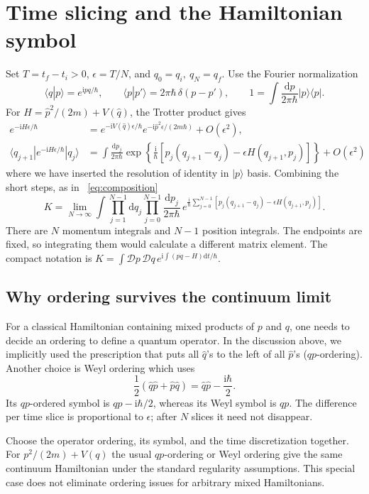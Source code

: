 \documentclass[11pt]{article}
\newcommand{\dd}{\mathrm d}
\newcommand{\ii}{\mathrm i}
\newcommand{\D}{\mathcal D}
\newcommand{\ket}[1]{\lvert#1\rangle}
\newcommand{\bra}[1]{\langle#1\rvert}
\newcommand{\module}[1]{\clearpage\section{#1}}
\begin{document}
\module{Time slicing and the Hamiltonian symbol}
Set \(T=t_f-t_i>0\), \(\epsilon=T/N\), and
\(q_0=q_i,\ q_N=q_f\). Use the Fourier normalization
\begin{equation}
 \langle q|p\rangle=e^{\ii pq/\hbar},\qquad
 \langle p|p'\rangle=2\pi\hbar\,\delta(p-p'),\qquad
 1=\int\frac{\dd p}{2\pi\hbar}\ket p\bra p.
\end{equation}
For \(H=\hat p^2/(2m)+V(\hat q)\), the Trotter product gives
\begin{align}
 e^{-\ii H\epsilon/\hbar}
 &=e^{-\ii V(\hat q)\epsilon/\hbar}
   e^{-\ii\hat p^2\epsilon/(2m\hbar)}+O(\epsilon^2),\\
 \langle q_{j+1}|e^{-\ii H\epsilon/\hbar}|q_j\rangle
 &=\int\frac{\dd p_j}{2\pi\hbar}
 \exp\!\left\{\frac{\ii}{\hbar}
 [p_j(q_{j+1}-q_j)-\epsilon H(q_{j+1},p_j)]\right\}
 +O(\epsilon^2)
\end{align}
where we have inserted the resolution of identity in $\ket{p}$ basis.
Combining the short steps, as in ~\eqref{eq:composition}
\begin{equation}
 K=\lim_{N\to\infty}\int\prod_{j=1}^{N-1}\dd q_j
       \prod_{j=0}^{N-1}\frac{\dd p_j}{2\pi\hbar}\,
 e^{\frac{\ii}{\hbar}\sum_{j=0}^{N-1}
 [p_j(q_{j+1}-q_j)-\epsilon H(q_{j+1},p_j)]}.       \label{eq:phase}
\end{equation}
There are \(N\) momentum integrals and \(N-1\) position integrals.
The endpoints are fixed, so integrating them would calculate a different
matrix element. The compact notation is
\(K=\int\D p\,\D q\,e^{\ii\int(p\dot q-H)\dd t/\hbar}\).

\subsection{Why ordering survives the continuum limit}
For a classical Hamiltonian containing mixed products of $p$ and $q$, one needs to decide an ordering to define a quantum operator. In the discussion above, we implicitly used the prescription that puts all
\(\hat q\)'s to the left of all \(\hat p\)'s ($qp$-ordering). Another choice is Weyl ordering which uses 
\begin{equation}
 \frac12(\hat q\hat p+\hat p\hat q)
 =\hat q\hat p-\frac{\ii\hbar}{2}.
\end{equation}
Its \(qp\)-ordered symbol is \(qp-\ii\hbar/2\), whereas its Weyl
symbol is \(qp\). The difference per time slice is proportional to
\(\epsilon\); after \(N\) slices it need not disappear.
\begin{remarkbox}
Choose the operator ordering, its symbol, and the time discretization
together. For \(p^2/(2m)+V(q)\) the usual $qp$-ordering or Weyl ordering give the same continuum Hamiltonian under the standard
regularity assumptions. This special case does not eliminate ordering
issues for arbitrary mixed Hamiltonians.
\end{remarkbox}
\end{document}
